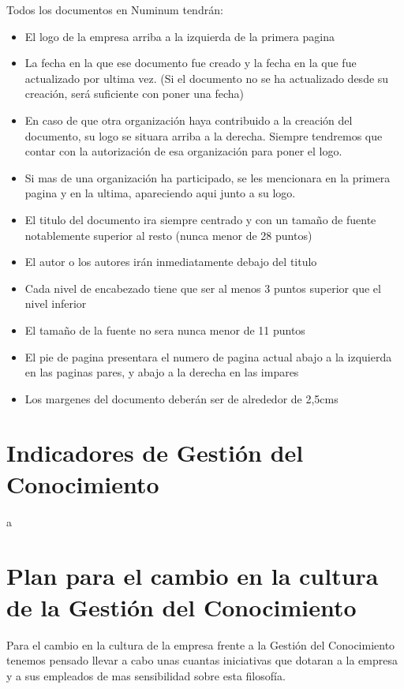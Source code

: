 \documentclass[twoside]{article}
\begin{document}
 Todos los documentos en Numinum tendrán:
 \begin{itemize}
 	\item  El logo de la empresa arriba a la izquierda de la primera pagina
	\item La fecha en la que ese documento fue creado y la fecha en la que fue actualizado por ultima vez. (Si el documento no se ha actualizado desde su creación, será suficiente con poner una fecha)
	\item  En caso de que otra organización haya contribuido a la creación del documento, su logo se situara arriba a la derecha. Siempre tendremos que contar con la autorización de esa organización para poner el logo.
	\item Si mas de una organización ha participado, se les mencionara en la primera pagina y en la ultima, apareciendo aqui junto a su logo.
	\item El titulo del documento ira siempre centrado y con un tamaño de fuente notablemente superior al resto (nunca menor de 28 puntos)
	\item El autor o los autores irán inmediatamente debajo del titulo
	\item Cada nivel de encabezado tiene que ser al menos 3 puntos superior que el nivel inferior
	\item El tamaño de la fuente no sera nunca menor de 11 puntos
	\item  El pie de pagina presentara el numero de pagina actual abajo a la izquierda en las paginas pares, y abajo a la derecha en las impares
	\item  Los margenes del documento deberán ser de alrededor de 2,5cms
	
 \end{itemize}

\section{Indicadores de Gestión del Conocimiento}

a

\section{Plan para el cambio en la cultura de la Gestión del Conocimiento}

Para el cambio en la cultura de la empresa frente a la Gestión del Conocimiento tenemos pensado llevar a cabo unas cuantas iniciativas que dotaran a la empresa y a sus empleados de mas sensibilidad sobre esta filosofía.
\end{document}
